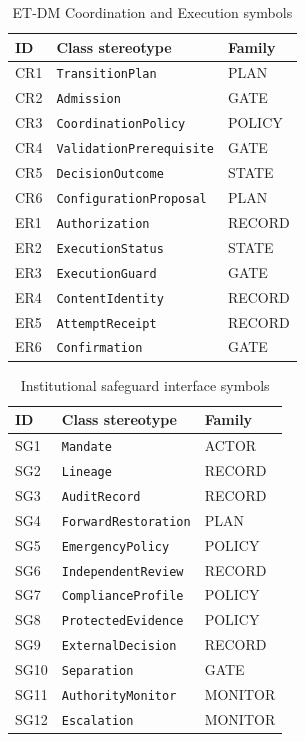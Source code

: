 \documentclass[journal]{IEEEtran}
\begin{document}
\begin{table}[!ht]
\centering
\caption{ET-DM Coordination and Execution symbols}
\label{tab:etdm_notation_symbols}
\footnotesize
\begin{tabular}{lll}
\hline
\textbf{ID} & \textbf{Class stereotype} & \textbf{Family}\\
\hline
CR1 & \texttt{TransitionPlan} & PLAN\\
CR2 & \texttt{Admission} & GATE\\
CR3 & \texttt{CoordinationPolicy} & POLICY\\
CR4 & \texttt{ValidationPrerequisite} & GATE\\
CR5 & \texttt{DecisionOutcome} & STATE\\
CR6 & \texttt{ConfigurationProposal} & PLAN\\
ER1 & \texttt{Authorization} & RECORD\\
ER2 & \texttt{ExecutionStatus} & STATE\\
ER3 & \texttt{ExecutionGuard} & GATE\\
ER4 & \texttt{ContentIdentity} & RECORD\\
ER5 & \texttt{AttemptReceipt} & RECORD\\
ER6 & \texttt{Confirmation} & GATE\\
\hline
\end{tabular}
\end{table}

\begin{table}[!ht]
\centering
\caption{Institutional safeguard interface symbols}
\label{tab:safeguard_notation_symbols}
\footnotesize
\begin{tabular}{lll}
\hline
\textbf{ID} & \textbf{Class stereotype} & \textbf{Family}\\
\hline
SG1 & \texttt{Mandate} & ACTOR\\
SG2 & \texttt{Lineage} & RECORD\\
SG3 & \texttt{AuditRecord} & RECORD\\
SG4 & \texttt{ForwardRestoration} & PLAN\\
SG5 & \texttt{EmergencyPolicy} & POLICY\\
SG6 & \texttt{IndependentReview} & RECORD\\
SG7 & \texttt{ComplianceProfile} & POLICY\\
SG8 & \texttt{ProtectedEvidence} & POLICY\\
SG9 & \texttt{ExternalDecision} & RECORD\\
SG10 & \texttt{Separation} & GATE\\
SG11 & \texttt{AuthorityMonitor} & MONITOR\\
SG12 & \texttt{Escalation} & MONITOR\\
\hline
\end{tabular}
\end{table}
\end{document}
